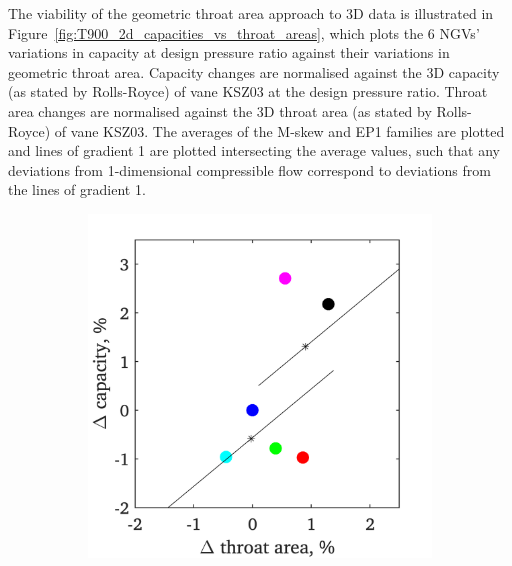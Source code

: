 \documentclass[a4paper, 11pt, oneside]{report}
\begin{document}
The viability of the geometric throat area approach to 3D data is illustrated in Figure~\ref{fig:T900_2d_capacities_vs_throat_areas}, which plots the 6 NGVs' variations in capacity at design pressure ratio against their variations in geometric throat area. Capacity changes are normalised against the 3D capacity (as stated by Rolls-Royce) of vane KSZ03 at the design pressure ratio. Throat area changes are normalised against the 3D throat area (as stated by Rolls-Royce) of vane KSZ03. The averages of the M-skew and EP1 families are plotted and lines of gradient 1 are plotted intersecting the average values, such that any deviations from 1-dimensional compressible flow correspond to deviations from the lines of gradient 1.

\begin{figure}[H]
	\centering
	\begin{subfigure}{.45\textwidth}
		\centering
		\includegraphics[width=\linewidth]{figs/T900_3d_capacities_vs_throat_areas.png}
	\end{subfigure}
	\begin{subfigure}{.1125\textwidth}
		\centering

\end{subfigure}
\end{figure}
\end{document}

